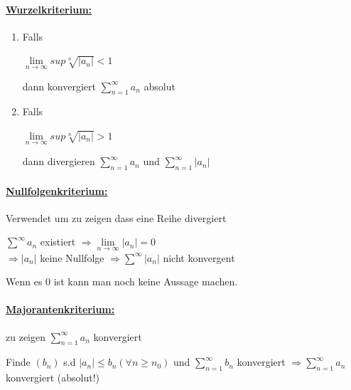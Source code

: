 \documentclass[8pt]{extreport}
\begin{document}
\paragraph{\underline{Wurzelkriterium:}}
\begin{enumerate}
\item Falls
\begin{center}
$\lim\limits_{n \to \infty}sup \sqrt[n]{|a_n|} < 1$
\end{center}
dann konvergiert $\displaystyle\sum_{n=1}^{\infty} a_n$ absolut
\item Falls
\begin{center}
$\lim\limits_{n \to \infty}sup \sqrt[n]{|a_n|} > 1$
\end{center}
dann divergieren $\displaystyle\sum_{n=1}^{\infty} a_n$ und $\displaystyle\sum_{n=1}^{\infty} |a_n|$
\end{enumerate}

\paragraph{\underline{Nullfolgenkriterium:}} Verwendet um zu zeigen dass eine Reihe divergiert\\
\begin{center}
$\displaystyle\sum^{\infty} a_n$ existiert $\Rightarrow \lim\limits_{n \to \infty}|a_n| = 0$\\
$\Rightarrow |a_n|$ keine Nullfolge $\Rightarrow \displaystyle\sum^{\infty}|a_n|$ nicht konvergent
\end{center} 
Wenn es 0 ist kann man noch keine Aussage machen.

\paragraph{\underline{Majorantenkriterium:}}

zu zeigen $\displaystyle\sum_{n=1}^{\infty}a_n$ konvergiert
\begin{center}
Finde $(b_n)$ s.d $|a_n| \leq b_n (\forall n \geq n_0)$ und $\displaystyle\sum_{n=1}^{\infty}b_n$ konvergiert $\Rightarrow \displaystyle\sum_{n=1}^{\infty}a_n$ konvergiert (absolut!)
\end{center}
\end{document}
